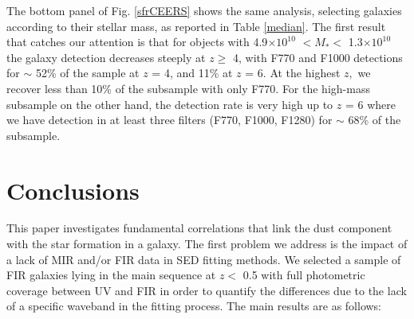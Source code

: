 \documentclass{aa}
\begin{document}
The bottom panel of Fig. \ref{sfrCEERS} shows the same analysis, selecting galaxies according to their stellar mass, as reported in Table \ref{median}. The first result that catches our attention is that for objects with 4.9$\times10^{10}$ $< M_\ast <$ 1.3$\times10^{10}$ the galaxy detection decreases steeply at $z \ge$ 4, with F770 and F1000 detections for $\sim$ 52\% of the sample at $z$ = 4, and 11\% at $z$ = 6. At the highest $z,$ we recover less than 10\% of the subsample with only F770. For the high-mass subsample on the other hand, the detection rate is very high up to $z$ = 6 where we have detection in at least three filters (F770, F1000, F1280) for $\sim$ 68\% of the subsample.

\section{Conclusions}
\label{conclusions}

This paper investigates fundamental correlations that link the dust component with the star formation in a galaxy. The first problem we address is the impact of a lack of MIR and/or FIR data in SED fitting methods. We selected a sample of FIR galaxies lying in the main sequence at $z <$ 0.5 with full photometric coverage between UV and FIR in order to quantify the differences due to the lack of a specific waveband in the fitting process. The main results are as follows:
\end{document}
